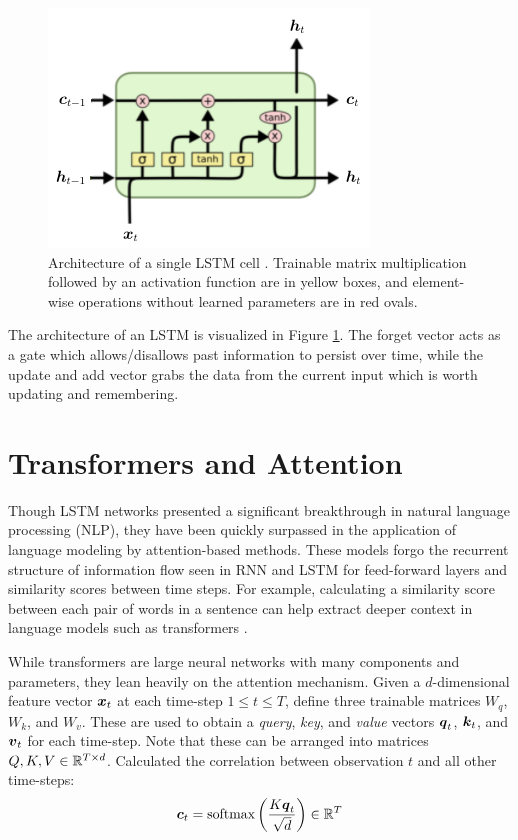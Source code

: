 \begin{figure}[h]
  \centering
  \includegraphics[width=.5\textwidth]{img/lstm_visual}
  \caption{Architecture of a single LSTM cell \cite{olah2015}. Trainable matrix multiplication followed by an activation function are in yellow boxes, and element-wise operations without learned parameters are in red ovals.}
  \label{fig:lstm_visual}
\end{figure}

The architecture of an LSTM is visualized in Figure \ref{fig:lstm_visual}. The forget vector acts as a gate which allows/disallows past information to persist over time, while the update and add vector grabs the data from the current input which is worth updating and remembering.


\section{Transformers and Attention}
Though LSTM networks presented a significant breakthrough in natural language processing (NLP), they have been quickly surpassed in the application of language modeling by attention-based methods. These models forgo the recurrent structure of information flow seen in RNN and LSTM for feed-forward layers and similarity scores between time steps. For example, calculating a similarity score between each pair of words in a sentence can help extract deeper context in language models such as transformers \cite{vaswani2017}.

While transformers are large neural networks with many components and parameters, they lean heavily on the attention mechanism. Given a $d$-dimensional feature vector $\boldsymbol{x}_t$ at each time-step $1\leq t\leq T$, define three trainable matrices $W_q$, $W_k$, and $W_v$. These are used to obtain a \textit{query}, \textit{key}, and \textit{value} vectors $\boldsymbol{q}_t$, $\boldsymbol{k}_t$, and $\boldsymbol{v}_t$ for each time-step. Note that these can be arranged into matrices $Q,K,V \in \mathbb{R}^{T\times d}$. Calculated the correlation between observation $t$ and all other time-steps:
\begin{equation}
  \boldsymbol{c}_t = \text{softmax}\left(\frac{K \boldsymbol{q}_t}{\sqrt{d}} \right) \in \mathbb{R}^T
  \label{eq:attn_cor}
\end{equation}


